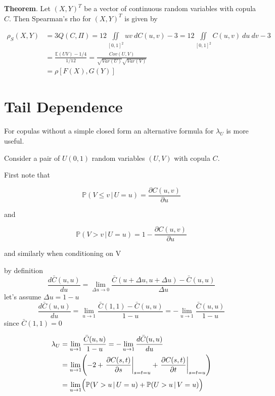 \documentclass{article}
\begin{document}

\noindent\textbf{Theorem}.  Let $(X, Y)^T$ be a vector of continuous random variables with copula $C$. Then Spearman's rho for $(X, Y)^T$ is given by

\begin{align}
\rho_S (X, Y) & = 3Q(C, \Pi) = 12 \iint\limits_{[0, 1]^2} uv \> dC(u, v) - 3 = 12 \iint\limits_{[0, 1]^2} C(u,v) \>du\>dv - 3 \\
& = \frac{\mathbb{E}(UV) - 1/4}{1/12} = \frac{Cov(U, V)}{\sqrt{Var(U)}\sqrt{Var(V)}} \\
& = \rho[F(X), G(Y)]
\end{align}
%
%
\section{Tail Dependence}

For copulas without a simple closed form an alternative formula for $\lambda_U$ is more useful.

Consider a pair of $U(0,1)$ random variables $(U,V)$ with copula $C$. 

First note that 

\begin{equation}
\mathbb{P} (V \le v \, | \, U = u) = \frac{\partial C(u,v)}{\partial u}
\end{equation}

and

\begin{equation}
\mathbb{P} (V > v \, | \, U = u) = 1- \frac{\partial C(u,v)}{\partial u}
\end{equation}

and similarly when conditioning on V

by definition
$$
\frac{d\bar C(u,u)}{du} = \lim\limits_{\Delta u\rightarrow 0} \frac{\bar C(u+\Delta u,u+\Delta u) - \bar C(u,u) }{\Delta u}
$$
let's assume $\Delta u = 1-u$
$$
\frac{d\bar C(u,u)}{du} = \lim\limits_{u\rightarrow 1} \frac{\bar C(1, 1) - \bar C(u,u) }{1- u} = -\lim\limits_{u\rightarrow 1} \frac{\bar C(u,u) }{1- u} 
$$
since $\bar C(1,1)=0$

\begin{equation}
\begin{split}
\lambda_U & = \lim\limits_{u\rightarrow 1} \frac{\bar C(u,u) }{1- u} = - \lim\limits_{u\rightarrow 1}  \frac{d\bar C(u,u)}{du}  \\
                 & = \lim\limits_{u\rightarrow 1} 
                       \Biggl(
							-2 + \left.\frac{\partial C(s,t)}{\partial s} \right|_{s=t=u}+ \left.\frac{\partial C(s,t)}{\partial t} \right|_{s=t=u}                       
                       \Biggr) \\
                 & = \lim\limits_{u\rightarrow 1} \Bigl(
                           \mathbb{P} (V > u\, |\, U = u) + \mathbb{P} (U > u \,|\, V = u)      
                       \Bigr)
\end{split}
\end{equation}
\end{document}
